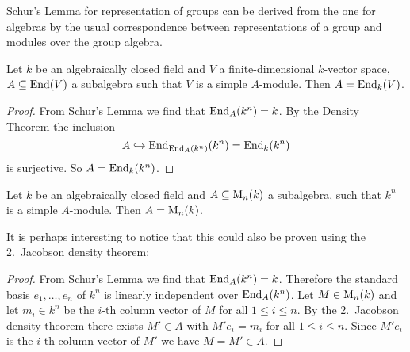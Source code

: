 \begin{remark}
  Schur’s Lemma for representation of groups can be derived from the one for algebras by the usual correspondence between representations of a group and modules over the group algebra.
\end{remark}


\begin{corollary}
  Let $k$ be an algebraically closed field and $V$ a finite-dimensional $k$-vector space, $A \subseteq \operatorname{End}(V)$ a subalgebra such that $V$ is a simple $A$-module.
  Then $A = \operatorname{End}_k(V)$.
\end{corollary}
\begin{proof}
  From Schur’s Lemma we find that $\operatorname{End}_A(k^n) = k$.
  By the Density Theorem the inclusion
  \[
                    A
    \hookrightarrow \operatorname{End}_{\operatorname{End}_A(k^n)}(k^n)
    =               \operatorname{End}_k(k^n)
  \]
  is surjective.
  So $A = \operatorname{End}_k(k^n)$.
\end{proof}


\begin{corollary}
  Let $k$ be an algebraically closed field and $A \subseteq \operatorname{M}_n(k)$ a subalgebra, such that $k^n$ is a simple $A$-module.
  Then $A = \operatorname{M}_n(k)$.
\end{corollary}


It is perhaps interesting to notice that this could also be proven using the 2.\ Jacobson density theorem:


\begin{proof}
  From Schur’s Lemma we find that $\operatorname{End}_A(k^n) = k$.
  Therefore the standard basis $e_1, \dotsc, e_n$ of $k^n$ is linearly independent over $\operatorname{End}_A(k^n)$.
  Let $M \in \operatorname{M}_n(k)$ and let $m_i \in k^n$ be the $i$-th column vector of $M$ for all $1 \leq i \leq n$.
  By the 2.\ Jacobson density theorem there exists $M' \in A$ with $M' e_i = m_i$ for all $1 \leq i \leq n$.
  Since $M' e_i$ is the $i$-th column vector of $M'$ we have $M = M' \in A$.
\end{proof}


